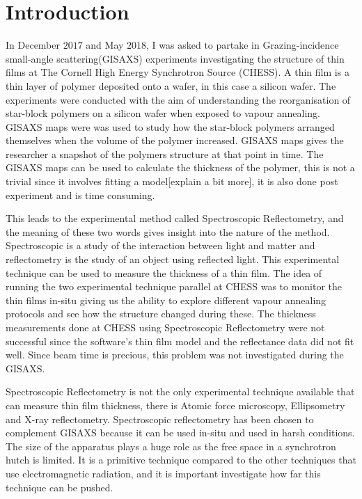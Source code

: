 \documentclass[MasterThesisMain.tex]{subfiles}
\begin{document}
	\chapter{Introduction}
	
In December $2017$ and May $2018$, I was asked to partake in Grazing-incidence small-angle scattering(GISAXS) experiments investigating the structure of thin films at The Cornell High Energy Synchrotron Source (CHESS). A thin film is a thin layer of polymer deposited onto a wafer, in this case a silicon wafer. The experiments were conducted with the aim of understanding the reorganisation of star-block polymers on a silicon wafer when exposed to vapour annealing. GISAXS maps were was used to study how the star-block polymers arranged themselves when the volume of the polymer increased. GISAXS maps gives the researcher a snapshot of the polymers structure at that point in time. The GISAXS maps can be used to calculate the thickness of the polymer, this is not a trivial since it involves fitting a model[explain a bit more], it is also done post experiment and is time consuming. 

This leads to the experimental method called Spectroscopic Reflectometry, and the meaning of these two words gives insight into the nature of the method. Spectroscopic is a study of the interaction between light and matter and reflectometry is the study of an object using reflected light. This experimental technique can be used to measure the thickness of a thin film. The idea of running the two experimental technique parallel at CHESS was to monitor the thin films in-situ giving us the ability to explore different vapour annealing protocols and see how the structure changed during these. The thickness measurements done at CHESS using Spectroscopic Reflectometry were not successful since the software's thin film model and the reflectance data did not fit well. Since beam time is precious, this problem was not investigated during the GISAXS.

Spectroscopic Reflectometry is not the only experimental technique available that can measure thin film thickness, there is Atomic force microscopy, Ellipsometry and X-ray reflectometry. Spectroscopic reflectometry has been chosen to complement GISAXS because it can be used in-situ and used in harsh conditions. The size of the apparatus plays a huge role as the free space in a synchrotron hutch is limited. It is a primitive technique compared to the other techniques that use electromagnetic radiation, and it is important investigate how far this technique can be pushed.
\end{document}
